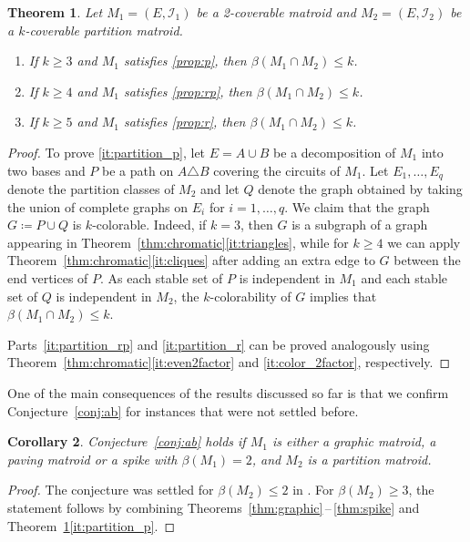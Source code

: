 \documentclass[11pt,a4paper]{article}
\theoremstyle{plain}
\newtheorem{thm}{Theorem}
\newtheorem{cor}[thm]{Corollary}
\theoremstyle{definition}
\newcommand{\cI}{\mathcal{I}}
\begin{document}
\begin{thm}\label{thm:partition}
Let $M_1=(E,\cI_1)$ be a 2-coverable matroid and $M_2=(E,\cI_2)$ be a $k$-coverable partition matroid.
\begin{enumerate}[label=(\alph*)]\itemsep0em 
    \item If $k \ge 3$ and $M_1$ satisfies \ref{prop:p}, then $\beta(M_1\cap M_2) \le k$. \label{it:partition_p}
    \item If $k \ge 4$ and $M_1$ satisfies \ref{prop:rp}, then $\beta(M_1\cap M_2) \le k$. \label{it:partition_rp}
    \item If $k\ge 5$ and $M_1$ satisfies \ref{prop:r}, then $\beta(M_1\cap M_2) \le k$. \label{it:partition_r}
\end{enumerate}
\end{thm}
\begin{proof}
To prove \ref{it:partition_p}, let $E=A\cup B$ be a decomposition of $M_1$ into two bases and $P$ be a path on $A\triangle B$ covering the circuits of $M_1$. Let $E_1,\dots,E_q$ denote the partition classes of $M_2$ and let $Q$ denote the graph obtained by taking the union of complete graphs on $E_i$ for $i=1,\dots, q$. We claim that the graph $G\coloneqq P\cup Q$ is $k$-colorable. Indeed, if $k=3$, then $G$ is a subgraph of a graph appearing in Theorem~\ref{thm:chromatic}\ref{it:triangles}, while for $k\ge 4$ we can apply Theorem~\ref{thm:chromatic}\ref{it:cliques} after adding an extra edge to $G$ between the end vertices of $P$. As each stable set of $P$ is independent in $M_1$ and each stable set of $Q$ is independent in $M_2$, the $k$-colorability of $G$ implies that $\beta(M_1\cap M_2) \le k$. 

Parts~\ref{it:partition_rp} and \ref{it:partition_r} can be proved analogously using Theorem~\ref{thm:chromatic}\ref{it:even2factor} and \ref{it:color_2factor}, respectively.
\end{proof}

One of the main consequences of the results discussed so far is that we confirm Conjecture~\ref{conj:ab} for instances that were not settled before.

\begin{cor} 
Conjecture~\ref{conj:ab} holds if $M_1$ is either a graphic matroid, a paving matroid or a spike with $\beta(M_1)=2$, and $M_2$ is a partition matroid.
\end{cor}
\begin{proof}
The conjecture was settled for $\beta(M_2)\leq 2$ in \cite{aharoni2012edge}. For $\beta(M_2)\geq 3$, the statement follows by combining Theorems~\ref{thm:graphic}\,--\,\ref{thm:spike} and Theorem~\ref{thm:partition}\ref{it:partition_p}.
\end{proof}
\end{document}
